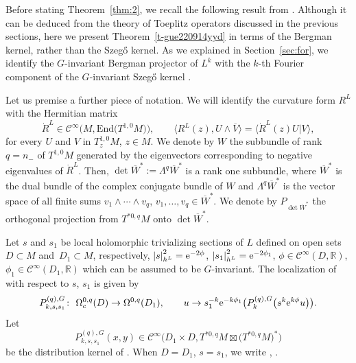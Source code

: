 \documentclass[10pt,a4paper]{amsart}
\numberwithin{equation}{section}
\newcommand{\ol}{\overline}
\newcommand{\abs}[1]{\left\vert#1\right\vert}
\newcommand{\To}{\rightarrow}
\begin{document}
 	Before stating Theorem~\ref{thm:2}, we recall the following result from \cite{hsiaohuang}. Although it can be deduced from the theory of Toeplitz operators discussed in the previous sections, here we present Theorem~\ref{t-gue220914yyd} in terms of the Bergman kernel, rather than the Szeg\H{o} kernel. As we explained in Section~\ref{sec:for}, we identify the $G$-invariant Bergman projector  of $L^k$ with the $k$-th Fourier component of the $G$-invariant Szeg\H{o} kernel .
 	
 	Let us premise a further piece of notation. We will identify the curvature form $R^L$ with the Hermitian matrix
 	\[\dot{R}^L\in\mathcal{C}^{\infty}\bigl(M,\mathrm{End}\bigl(T^{1,0}M\bigr)\bigr) , \qquad \big\langle R^L(z) , U\wedge\overline{V} \big\rangle =\big\langle \dot{R}^L(z)U | V \big\rangle,\]
 	for every $U$ and $V$ in $T^{1,0}_zM$, $z\in M$. We denote by $W$ the subbundle of rank $q=n_-$ of $T^{1,0}M$ generated by the eigenvectors corresponding to negative eigenvalues of $\dot{R}^L$. Then, $\det \ol{W}^*:=\Lambda^q\ol{W}^*$ is a rank one subbundle, where $\ol{W}^*$ is the dual bundle of the complex conjugate bundle of $W$ and $\Lambda^q\ol{W}^*$ is the vector space of all finite sums $v_1\wedge\cdots\wedge v_q$, $v_1,\dots,v_q\in\ol{W}^*$. We denote by
 	$P_{\det \ol{W}^*}$ the orthogonal projection from $T^{*0,q}M$ onto $\det \ol{W}^*$.
 	
 	Let $s$ and $s_1$ be local holomorphic trivializing sections of $L$ defined on open sets $D\subset M$ and~${D_1\subset M}$, respectively, $\abs{s}^2_{h^L}={\rm e}^{-2\phi}$, $\abs{s_1}^2_{h^L}={\rm e}^{-2\phi_1}$, $\phi\in\mathcal{C}^\infty(D,\mathbb R)$, $\phi_1\in\mathcal{C}^\infty(D_1,\mathbb R)$ which can be assumed to be $G$-invariant. The localization of  with respect to $s$, $s_1$ is given by
 	\[
 		P^{(q),G}_{k,s,s_1}\colon\ \Omega^{0,q}_c(D)\To\Omega^{0,q}(D_1),\qquad
 		u\To s^{-k}_1{\rm e}^{-k\phi_1}\bigl(P^{(q),G}_k\bigl(s^k{\rm e}^{k\phi}u\bigr)\bigr).
\]
 	Let \[P^{(q),G}_{k,s,s_1}(x,y)\in\mathcal{C}^\infty\bigl(D_1\times D,T^{*0,q}M\boxtimes\bigl(T^{*0,q}M\bigr)^*\bigr)\] be the distribution kernel of . When $D=D_1$, $s=s_1$, we write ,
 	.
 	
\end{document}
